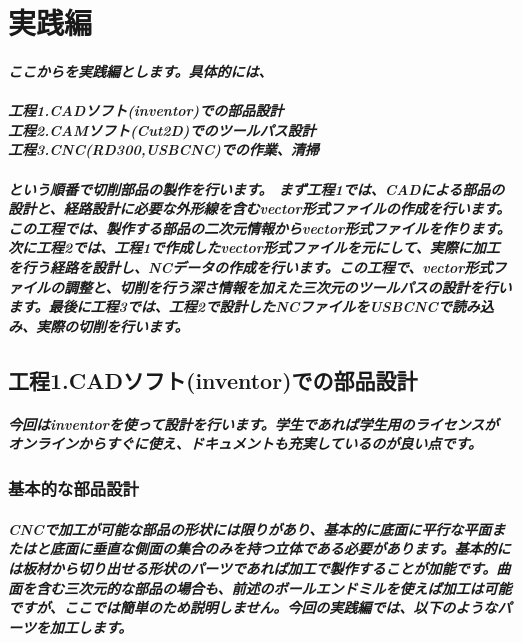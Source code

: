 \documentclass[b5paper, 9pt, twocolumn, titlepage,openany]{jsbook}%
\begin{document}
\chapter{実践編}
\paragraph{ここからを実践編とします。具体的には、\\\\
  工程1.CADソフト(inventor)での部品設計\\
  工程2.CAMソフト(Cut2D)でのツールパス設計\\
  工程3.CNC(RD300,USBCNC)での作業、清掃\\\\
  という順番で切削部品の製作を行います。
  まず工程1では、CADによる部品の設計と、経路設計に必要な外形線を含むvector形式ファイルの作成を行います。この工程では、製作する部品の二次元情報からvector形式ファイルを作ります。次に工程2では、工程1で作成したvector形式ファイルを元にして、実際に加工を行う経路を設計し、NCデータの作成を行います。この工程で、vector形式ファイルの調整と、切削を行う深さ情報を加えた三次元のツールパスの設計を行います。最後に工程3では、工程2で設計したNCファイルをUSBCNCで読み込み、実際の切削を行います。}

\section{工程1.CADソフト(inventor)での部品設計}
\paragraph{今回はinventorを使って設計を行います。学生であれば学生用のライセンスがオンラインからすぐに使え、ドキュメントも充実しているのが良い点です。}

\subsection{基本的な部品設計}
\paragraph{CNCで加工が可能な部品の形状には限りがあり、基本的に底面に平行な平面またはと底面に垂直な側面の集合のみを持つ立体である必要があります。基本的には板材から切り出せる形状のパーツであれば加工で製作することが加能です。曲面を含む三次元的な部品の場合も、前述のボールエンドミルを使えば加工は可能ですが、ここでは簡単のため説明しません。今回の実践編では、以下のようなパーツを加工します。}
\end{document}
